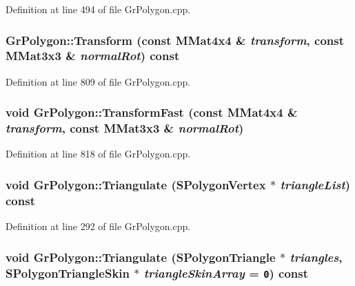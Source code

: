 \begin{CompactItemize}
Definition at line 494 of file GrPolygon.cpp.\hypertarget{class_gr_polygon_c8fc7a0caec236dfac7f44abc38a17e5}{
\subsubsection[{Transform}]{ GrPolygon::Transform (const {\bf MMat4x4} \& {\em transform}, \/  const {\bf MMat3x3} \& {\em normalRot}) const}}
\label{class_gr_polygon_c8fc7a0caec236dfac7f44abc38a17e5}




Definition at line 809 of file GrPolygon.cpp.\hypertarget{class_gr_polygon_312706662a832bd7fdc652fb55bcdd56}{
\subsubsection[{TransformFast}]{\setlength{\rightskip}{0pt plus 5cm}void GrPolygon::TransformFast (const {\bf MMat4x4} \& {\em transform}, \/  const {\bf MMat3x3} \& {\em normalRot})}}
\label{class_gr_polygon_312706662a832bd7fdc652fb55bcdd56}




Definition at line 818 of file GrPolygon.cpp.\hypertarget{class_gr_polygon_762d861ad057a916daf5e6b376f31ec8}{
\subsubsection[{Triangulate}]{\setlength{\rightskip}{0pt plus 5cm}void GrPolygon::Triangulate ({\bf SPolygonVertex} $\ast$ {\em triangleList}) const}}
\label{class_gr_polygon_762d861ad057a916daf5e6b376f31ec8}




Definition at line 292 of file GrPolygon.cpp.\hypertarget{class_gr_polygon_94c81cc3e6f419a814119a7dc3c4d78b}{
\subsubsection[{Triangulate}]{\setlength{\rightskip}{0pt plus 5cm}void GrPolygon::Triangulate ({\bf SPolygonTriangle} $\ast$ {\em triangles}, \/  {\bf SPolygonTriangleSkin} $\ast$ {\em triangleSkinArray} = {\tt 0}) const}}
\label{class_gr_polygon_94c81cc3e6f419a814119a7dc3c4d78b}





\end{CompactItemize}
